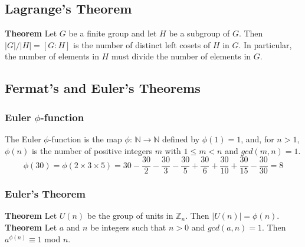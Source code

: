 \documentclass{article}
\begin{document}
\subsection{Lagrange's Theorem}
\textbf{Theorem}
Let $G$ be a finite group and let $H$ be a subgroup of $G$. Then $|G|/|H|=[G:H]$ is the number of distinct left cosets of $H$ in $G$. In particular, the number of elements in $H$ must divide the number of elements in $G$.
\subsection{Fermat's and Euler's Theorems}
\subsubsection{Euler $\phi$-function}
The Euler $\phi$-function is the map $\phi$: $\mathbb{N}\rightarrow \mathbb{N}$ defined by $\phi(1)=1$, and, for $n>1$, $\phi(n)$ is the number of positive integers $m$ with $1\leq m<n$ and $gcd(m,n)=1$.
$$\phi(30)=\phi(2\times 3\times 5)=30-\frac{30}{2}-\frac{30}{3}-\frac{30}{5}+\frac{30}{6}+\frac{30}{10}+\frac{30}{15}-\frac{30}{30}=8$$
\subsubsection{Euler's Theorem}
\textbf{Theorem}
Let $U(n)$ be the group of units in $\mathbb{Z}_n$. Then $|U(n)|=\phi(n)$.\\
\textbf{Theorem}
Let $a$ and $n$ be integers such that $n>0$ and $gcd(a,n)=1$. Then $a^{\phi(n)}\equiv 1$ mod $n$.
\end{document}
